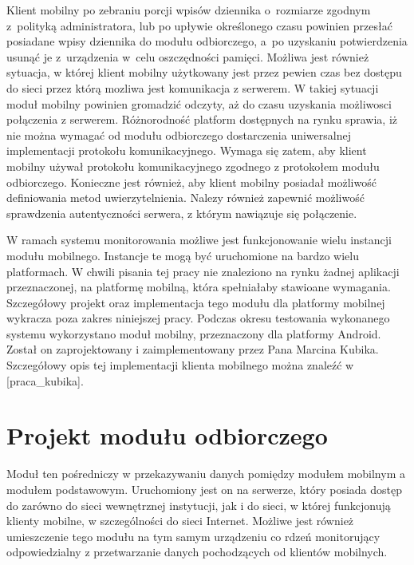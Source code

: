 Klient mobilny po zebraniu porcji wpisów dziennika o~rozmiarze zgodnym
z~polityką administratora, lub po upływie określonego czasu powinien
przesłać posiadane wpisy dziennika do modułu odbiorczego, a~po
uzyskaniu potwierdzenia usunąć je z~urządzenia w~celu oszczędności
pamięci. Możliwa jest również sytuacja, w której klient mobilny
użytkowany jest przez pewien czas bez dostępu do sieci przez którą
mozliwa jest komunikacja z serwerem. W takiej sytuacji moduł mobilny
powinien gromadzić odczyty, aż do czasu uzyskania możliwosci
połączenia z serwerem. Różnorodność platform dostępnych na rynku
sprawia, iż nie można wymagać od modułu odbiorczego dostarczenia
uniwersalnej implementacji protokołu komunikacyjnego. Wymaga się
zatem, aby klient mobilny używał protokołu komunikacyjnego zgodnego z
protokołem modułu odbiorczego. Konieczne jest również, aby klient
mobilny posiadał możliwość definiowania metod uwierzytelnienia. Nalezy
również zapewnić możliwość sprawdzenia autentyczności serwera, z
którym nawiązuje się połączenie.

W ramach systemu monitorowania możliwe jest funkcjonowanie wielu
instancji modułu mobilnego. Instancje te mogą być uruchomione na
bardzo wielu platformach. W chwili pisania tej pracy nie znaleziono na
rynku żadnej aplikacji przeznaczonej, na platformę mobilną, która
spełniałaby stawioane wymagania. Szczegółowy projekt oraz
implementacja tego modułu dla platformy mobilnej wykracza poza zakres
niniejszej pracy. Podczas okresu testowania wykonanego systemu
wykorzystano moduł mobilny, przeznaczony dla platformy Android. Został
on zaprojektowany i zaimplementowany przez Pana Marcina
Kubika. Szczegółowy opis tej implementacji klienta mobilnego można
znaleźć w [praca\_kubika].

\section[Projekt modułu odbiorczego][Projekt modułu odbiorczego]{Projekt modułu odbiorczego}
\label{sec:ProjModOdb}

Moduł ten pośredniczy w przekazywaniu danych pomiędzy modułem mobilnym
a modułem podstawowym. Uruchomiony jest on na serwerze, który posiada
dostęp do zarówno do sieci wewnętrznej instytucji, jak i do sieci, w
której funkcjonują klienty mobilne, w szczególności do sieci
Internet. Możliwe jest również umieszczenie tego modułu na tym samym
urządzeniu co rdzeń monitorujący odpowiedzialny z przetwarzanie danych
pochodzących od klientów mobilnych.

